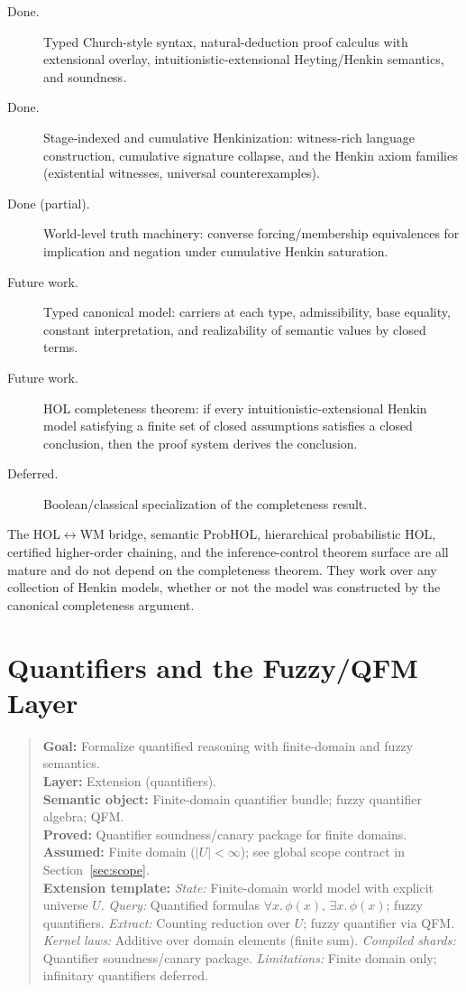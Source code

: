 \documentclass[11pt,openany]{report}
\begin{document}
\begin{description}
\item[Done.] Typed Church-style syntax, natural-deduction proof calculus
  with extensional overlay, intuitionistic-extensional Heyting/Henkin
  semantics, and soundness.
\item[Done.] Stage-indexed and cumulative Henkinization: witness-rich language
  construction, cumulative signature collapse, and the Henkin axiom families
  (existential witnesses, universal counterexamples).
\item[Done (partial).] World-level truth machinery: converse forcing/membership
  equivalences for implication and negation under cumulative Henkin saturation.
\item[Future work.] Typed canonical model: carriers at each type, admissibility,
  base equality, constant interpretation, and realizability of semantic values by
  closed terms.
\item[Future work.] HOL completeness theorem: if every intuitionistic-extensional
  Henkin model satisfying a finite set of closed assumptions satisfies a closed
  conclusion, then the proof system derives the conclusion.
\item[Deferred.] Boolean/classical specialization of the completeness result.
\end{description}

The HOL$\leftrightarrow$WM bridge, semantic ProbHOL, hierarchical probabilistic
HOL, certified higher-order chaining, and the inference-control theorem surface
are all mature and do not depend on the completeness theorem.  They work over
any collection of Henkin models, whether or not the model was constructed by the
canonical completeness argument.


\chapter{Quantifiers and the Fuzzy/QFM Layer}
\label{ch:quantifiers}

\begin{quote}\small
\textbf{Goal:} Formalize quantified reasoning with finite-domain and fuzzy semantics.\\
\textbf{Layer:} Extension (quantifiers).\\
\textbf{Semantic object:} Finite-domain quantifier bundle; fuzzy quantifier algebra; QFM.\\
\textbf{Proved:} Quantifier soundness/canary package for finite domains.\\
\textbf{Assumed:} Finite domain ($|U| < \infty$); see global scope contract in Section~\ref{sec:scope}.\\[4pt]
\textbf{Extension template:}
\textit{State:} Finite-domain world model with explicit universe $U$.
\textit{Query:} Quantified formulas $\forall x.\, \phi(x)$, $\exists x.\, \phi(x)$; fuzzy quantifiers.
\textit{Extract:} Counting reduction over $U$; fuzzy quantifier via QFM.
\textit{Kernel laws:} Additive over domain elements (finite sum).
\textit{Compiled shards:} Quantifier soundness/canary package.
\textit{Limitations:} Finite domain only; infinitary quantifiers deferred.
\end{quote}
\end{document}
